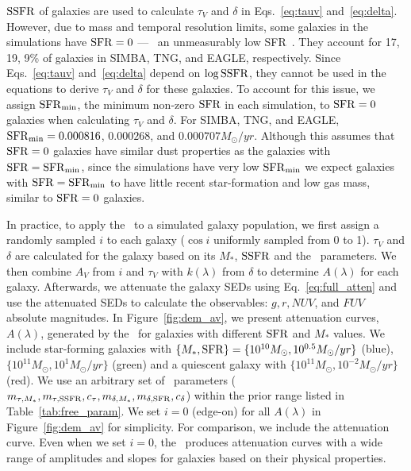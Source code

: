 

${\rm SSFR}$ of galaxies are used to calculate $\tau_V$ and $\delta$ in
Eqs.~\ref{eq:tauv} and~\ref{eq:delta}. However, due to mass and temporal resolution limits,
some galaxies in the simulations have ${\rm SFR}=0$ --- \ie~an unmeasurably low
SFR~\citep{hahn2019c}. They account for 17, 19, 9\% of galaxies
in SIMBA, TNG, and EAGLE, respectively. Since Eqs.~\ref{eq:tauv}
and~\ref{eq:delta} depend on $\log{\rm SSFR}$, they cannot be used in the equations
to derive $\tau_V$ and $\delta$ for these galaxies. To account for this issue,
we assign ${\rm SFR}_{\rm min}$, the minimum non-zero ${\rm SFR}$ in each simulation, to
${\rm SFR}=0$ galaxies when calculating $\tau_V$ and $\delta$. For SIMBA, TNG, and
EAGLE, ${\rm SFR}_{\rm min}=0.000816$, $0.000268$, and $0.000707 M_\odot/yr$. Although 
this assumes that ${\rm SFR}=0$ galaxies have similar dust properties as the galaxies 
with ${\rm SFR} = {\rm SFR}_{\rm min}$, since the simulations have very low ${\rm SFR}_{\rm min}$ 
we expect galaxies with ${\rm SFR} = {\rm SFR}_{\rm min}$ to have little recent
star-formation and low gas mass, similar to ${\rm SFR}=0$ galaxies. 


In practice, to apply the \eda~to a simulated galaxy population, we first
assign a randomly sampled $i$ to each galaxy ($\cos i$ uniformly sampled from 0 to 1).
$\tau_V$ and $\delta$ are calculated for
the galaxy based on its $M_*$,
${\rm SSFR}$ and the \eda~parameters. We then combine $A_V$ from $i$ and
$\tau_V$ with $k(\lambda)$ from $\delta$ to determine $A(\lambda)$ for each
galaxy.
Afterwards, we attenuate the galaxy SEDs using Eq.~\ref{eq:full_atten} and use
the attenuated SEDs to calculate the observables: $g, r, NUV$, and $FUV$
absolute magnitudes. 
In Figure~\ref{fig:dem_av}, we present attenuation curves, $A(\lambda)$,
generated by the \eda~for galaxies with different ${\rm SFR}$ and $M_*$ values.  
We include star-forming galaxies with $\{M_*, {\rm SFR}\} = \{10^{10}M_\odot,
10^{0.5}M_\odot/yr\}$ (blue), $\{10^{11}M_\odot, 10^{1} M_\odot/yr\}$
(green) and a quiescent galaxy with $\{10^{11}M_\odot, 10^{-2}M_\odot/yr\}$
(red).
We use an arbitrary set of \eda~parameters ($m_{\tau,M_*}, m_{\tau,{\rm SSFR}}, c_\tau,
m_{\delta,M_*}, m_{\delta,{\rm SFR}}, c_\delta$) within the prior range listed in
Table~\ref{tab:free_param}. 
We set $i=0$ (edge-on) for all $A(\lambda)$ in Figure~\ref{fig:dem_av} for
simplicity.
For comparison, we include the \cite{calzetti2001} attenuation curve. Even when
we set $i=0$, the \eda~produces attenuation curves with a wide range
of amplitudes and slopes for galaxies based on their physical properties. 

